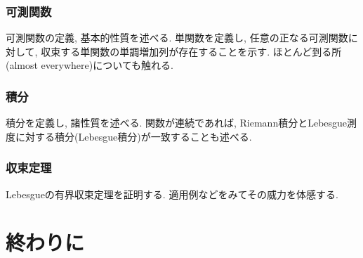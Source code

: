 \documentclass[a4j,dvipdfmx]{jsarticle}
\numberwithin{equation}{section}
\begin{document}
    \section{可測関数}
        可測関数の定義, 基本的性質を述べる. 単関数を定義し, 任意の正なる可測関数に対して, 収束する単関数の単調増加列が存在することを示す.
        ほとんど到る所(almost everywhere)についても触れる.
    \clearpage
    \section{積分}
        積分を定義し, 諸性質を述べる. 関数が連続であれば, Riemann積分とLebesgue測度に対する積分(Lebesgue積分)が一致することも述べる.
    \clearpage
    \section{収束定理}
        Lebesgueの有界収束定理を証明する. 適用例などをみてその威力を体感する.
    \clearpage
    \part{終わりに}
        \clearpage
    \printindex
\end{document}
